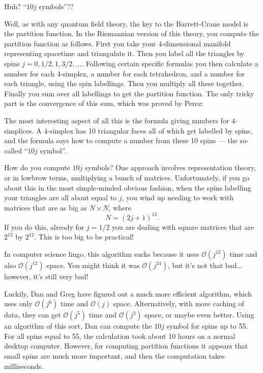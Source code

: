 \documentclass{article}
\def\tightlist{}
\renewcommand{\texttt}[1]{%
  \begingroup
  \ttfamily
  \begingroup\lccode`~=`/\lowercase{\endgroup\def~}{/\discretionary{}{}{}}%
  \begingroup\lccode`~=`[\lowercase{\endgroup\def~}{[\discretionary{}{}{}}%
  \begingroup\lccode`~=`.\lowercase{\endgroup\def~}{.\discretionary{}{}{}}%
  \catcode`/=\active\catcode`[=\active\catcode`.=\active
  \scantokens{#1\noexpand}%
  \endgroup
}
\begin{document}
Huh? ``\(10j\) symbols''??

Well, as with any quantum field theory, the key to the Barrett-Crane
model is the partition function. In the Riemannian version of this
theory, you compute the partition function as follows. First you take
your \(4\)-dimensional manifold representing spacetime and triangulate
it. Then you label all the triangles by spins
\(j = 0, 1/2, 1, 3/2, \ldots\). Following certain specific formulas you
then calculate a number for each 4-simplex, a number for each
tetrahedron, and a number for each triangle, using the spin labellings.
Then you multiply all these together. Finally you sum over all
labellings to get the partition function. The only tricky part is the
convergence of this sum, which was proved by Perez:


The most interesting aspect of all this is the formula giving numbers
for \(4\)-simplices. A \(4\)-simplex has 10 triangular faces all of
which get labelled by spins, and the formula says how to compute a
number from these 10 spins --- the so-called ``\(10j\) symbol''.

How do you compute \(10j\) symbols? One approach involves representation
theory, or in lowbrow terms, multiplying a bunch of matrices.
Unfortunately, if you go about this in the most simple-minded obvious
fashion, when the spins labelling your triangles are all about equal to
\(j\), you wind up needing to work with matrices that are as big as
\(N\times N\), where \[N = (2j+1)^{12}.\] If you do this, already for
\(j = 1/2\) you are dealing with square matrices that are \(2^{12}\) by
\(2^{12}\). This is too big to be practical!

In computer science lingo, this algorithm sucks because it uses
\(\mathcal{O}(j^{12})\) time and also \(\mathcal{O}(j^{12})\) space. You
might think it was \(\mathcal{O}(j^{24})\), but it's not that
bad\ldots{} however, it's still very bad!

Luckily, Dan and Greg have figured out a much more efficient algorithm,
which uses only \(\mathcal{O}(j^6)\) time and \(\mathcal{O}(j)\) space.
Alternatively, with more caching of data, they can get
\(\mathcal{O}(j^5)\) time and \(\mathcal{O}(j^3)\) space, or maybe even
better. Using an algorithm of this sort, Dan can compute the \(10j\)
symbol for spins up to 55. For all spins equal to 55, the calculation
took about 10 hours on a normal desktop computer. However, for computing
partition functions it appears that small spins are much more important,
and then the computation takes milliseconds.
\end{document}
